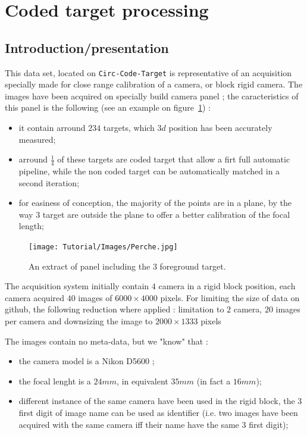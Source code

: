 \section{Coded target processing}


\subsection{Introduction/presentation}

This data set, located on {\tt Circ-Code-Target} is representative of an acquisition specially made for close 
range calibration of a camera, or block rigid camera.  The images have been
acquired on specially build camera panel ; the caracteristics of this panel
is the following (see an example on figure~\ref{fig:CodeT:Panel}) :
 

\begin{itemize}
     \item it contain arround $234$ targets, which $3d$ position has been accurately measured;

     \item arround $\frac{1}{4}$ of these targets are coded target that allow a firt full automatic pipeline,
           while the non coded target can  be automatically matched in a second iteration;

     \item for easiness of conception,  the majority of the points are in a plane, by the way $3$ target
           are outside the plane  to offer a better calibration of the focal length;
\end{itemize}


\begin{figure}
\centering
	\texttt{[image: Tutorial/Images/Perche.jpg]}
	\caption{An extract of panel including the $3$ foreground target.}
\label{fig:CodeT:Panel}
\end{figure}


The acquisition system initially contain $4$ camera in a rigid block position, each camera acquired
$40$ images of $6000 \times  4000$ pixels. For limiting the size of data on github, the following reduction
where applied : limitation to $2$ camera, $20$ images per camera and downsizing the image to $2000 \times  1333$ pixels

The images contain no meta-data, but we "know" that :

\begin{itemize}
     \item the camera model is a Nikon D5600 ;
     \item the focal lenght is a $24mm$, in equivalent $35mm$ (in fact a $16mm$);
     \item different instance of the same camera have been used in the rigid
           block, the $3$ first digit of image name can be used as identifier
           (i.e. two images have been acquired with the same camera iff their name have the
		same $3$ first digit);
\end{itemize}


